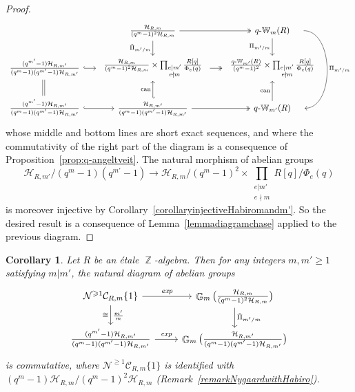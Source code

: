 \documentclass[10pt,twoside]{scrarticle}
\newlength{\mar} \setlength{\mar}{1cm}%
\newlength{\len}
\newtheorem{corollary}[theorem]{Corollary}
\theoremstyle{definition}
\DeclareMathOperator{\Z}{\mathbb{Z}}
\DeclareMathOperator{\G}{\mathbb{G}}
\newcommand{\can}{\text{can}}
\newcommand{\CRm}{\mathcal{C}_{R,m}}
\newcommand{\qW}{q\text{-}\mathbb{W}}
\renewcommand{\ge}{\geqslant}
\numberwithin{equation}{theorem}
\begin{document}
\begin{proof}
    \[\begin{tikzcd}[column sep=1.5 em]
	& {\frac{\mathcal{H}_{R,m}}{(q^m-1)^2\mathcal{H}_{R,m}}} & {\qW_m(R)} \\
	{\frac{(q^{m'}-1)\mathcal{H}_{R,m'}}{(q^{m}-1)(q^{m'}-1)\mathcal{H}_{R,m'}}} & \begin{array}{c} \frac{\mathcal{H}_{R,m}}{(q^m-1)^2\mathcal{H}_{R,m}}\times \prod_{\substack{e|m' \\e \nmid m}}{\frac{R[q]}{\Phi_e(q)}} \end{array} & \begin{array}{c} \frac{\qW_{m'}(R)}{(q^m-1)^2}\times \prod_{\substack{e|m' \\e \nmid m}}{\frac{R[q]}{\Phi_e(q)}} \end{array} \\
	{\frac{(q^{m'}-1)\mathcal{H}_{R,m'}}{(q^{m}-1)(q^{m'}-1)\mathcal{H}_{R,m'}}} & {\frac{\mathcal{H}_{R,m'}}{(q^{m}-1)(q^{m'}-1)\mathcal{H}_{R,m'}}} & {\qW_{m'}(R)}
	\arrow[two heads, from=1-2, to=1-3]
	\arrow["{\tilde{\Pi}_{m'/m}}"', from=1-2, to=2-2]
	\arrow["{\Pi_{m'/m}}"', from=1-3, to=2-3]
	\arrow["{\Pi_{m'/m}}", shift left=5, bend right=-90pt, from=1-3, to=3-3]
	\arrow[hook, from=2-1, to=2-2]
	\arrow[no head, from=2-1, to=3-1]
	\arrow[shift right, no head, from=2-1, to=3-1]
	\arrow[two heads, from=2-2, to=2-3]
	\arrow[hook, from=3-1, to=3-2]
	\arrow["{\can}",hook', from=3-2, to=2-2]
	\arrow[two heads, from=3-2, to=3-3]
	\arrow["{\can}", from=3-3, to=2-3]
    \end{tikzcd}\]
    whose middle and bottom lines are short exact sequences, and where the commutativity of the right part of the diagram is a consequence of Proposition~\ref{prop:q-angeltveit}. The natural morphism of abelian groups
    $$\mathcal{H}_{R,m'}/(q^m-1)(q^{m'}-1) \longrightarrow \mathcal{H}_{R,m}/(q^m-1)^2 \times \displaystyle\prod_{\substack{e|m' \\e \nmid m}} R[q]/\Phi_e(q)$$
    is moreover injective by Corollary~\ref{corollaryinjectiveHabiromandm'}. 
    So the desired result is a consequence of Lemma~\ref{lemmadiagramchase} applied to the previous diagram.
\end{proof}

\begin{corollary}\label{corollaryliftedcyclotomicpowercommutativediagram}
    Let $R$ be an étale $\Z$-algebra. Then for any integers $m,m' \ge 1$ satisfying $m|m'$, the natural diagram of abelian groups
    $$\begin{tikzcd}
        \mathcal{N}^{\ge 1}\CRm\{1\} \arrow[r,"\emph{exp}"] \arrow[d,"\frac{m'}{m}","\cong"'] & \G_m\big({\frac{\mathcal{H}_{R,m}}{(q^m-1)^2\mathcal{H}_{R,m}}}\big) \arrow[d,"\tilde{\Pi}_{m'/m}"] \\
        {\frac{(q^{m'}-1)\mathcal{H}_{R,m'}}{(q^{m}-1)(q^{m'}-1)\mathcal{H}_{R,m'}}} \arrow[r,"\emph{exp}"] & \G_m\big({\frac{\mathcal{H}_{R,m'}}{(q^m-1)(q^{m'}-1)\mathcal{H}_{R,m'}}}\big)
    \end{tikzcd}$$
    is commutative, where $\mathcal{N}^{\ge 1}\CRm\{1\}$ is identified with $(q^m-1)\mathcal{H}_{R,m}/(q^m-1)^2 \mathcal{H}_{R,m}$ (Remark~\ref{remarkNygaardwithHabiro}).
\end{corollary}
\end{document}
